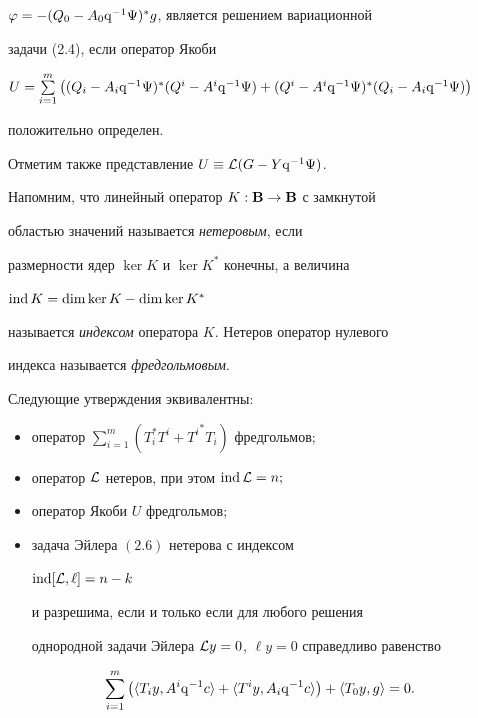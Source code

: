 $\varphi=-(Q_0-A_0\mathrm{q}^{-1}\Psi)^*g$, является решением вариационной


задачи (2.4), если оператор Якоби


$U=\sum\limits_{i=1}^m\big((Q_i-


A_i\q^{-1}\Psi)^*(Q^i-A^i\q^{-1}\Psi)+


(Q^i-A^i\q^{-1}\Psi)^*(Q_i-A_i\q^{-1}\Psi)\big)$


положительно определен.


Отметим также представление $U\equiv{\cal L}(G-Y\mathrm{q}^{-1}\Psi)$.





Напомним, что линейный оператор $K:\bold B{}\to\bold B{}$ с замкнутой


областью значений называется {\it нетеровым}, если


размерности ядер $\ker K$ и $\ker K^*$ конечны, а величина


$\operatorname{ind} K=\dim \ker K-\dim\ker K^*$


называется {\it индексом} оператора $K$. Нетеров оператор нулевого


индекса называется {\it фредгольмовым}.





\begin{thm}


Следующие утверждения эквивалентны$:$


\begin{itemize}


\item[а)] оператор $\sum\limits_{i=1}^m(T_i^*T^i+{T^i}^*T_i)$ фредгольмов$;$


\item[б)] оператор $\cal L$ нетеров, при этом $\operatorname{ind} {\cal L}=n;$


\item[в)] оператор Якоби $U$ фредгольмов$;$


\item[г)] задача Эйлера $(2.6)$ нетерова с индексом


$\operatorname{ind} [{\cal L},\ell]=n-k$


и разрешима, если и только если для любого решения


однородной задачи Эйлера ${\cal L}y=0$, $\ell y=0$ справедливо равенство


\end{itemize}


$$


\sum_{i=1}^m\big(\langle T_iy,A^i\q^{-1}c\rangle+


\langle T^iy,A_i\q^{-1}c\rangle\big)+\langle T_0y,g\rangle=0.


$$


\end{thm}





